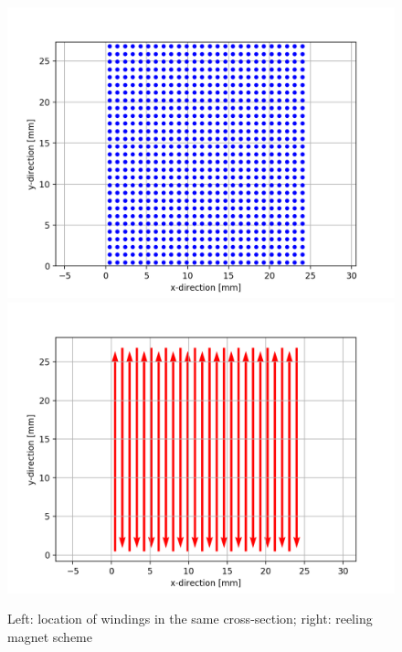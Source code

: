 \begin{figure}[h!]
    \centering
    \includegraphics[width=0.49\linewidth]{figures/skew_quad_bcs/magnetic_field_mapping/Quadrupole_Winding_Map_plot.png}
    \includegraphics[width=0.49\linewidth]{figures/skew_quad_bcs/magnetic_field_mapping/Winding_Scheme.png}
    
    \caption{Left: location of windings in the same cross-section; right: reeling magnet scheme}
    \label{fig:Skew_quad_cross_section}
\end{figure}